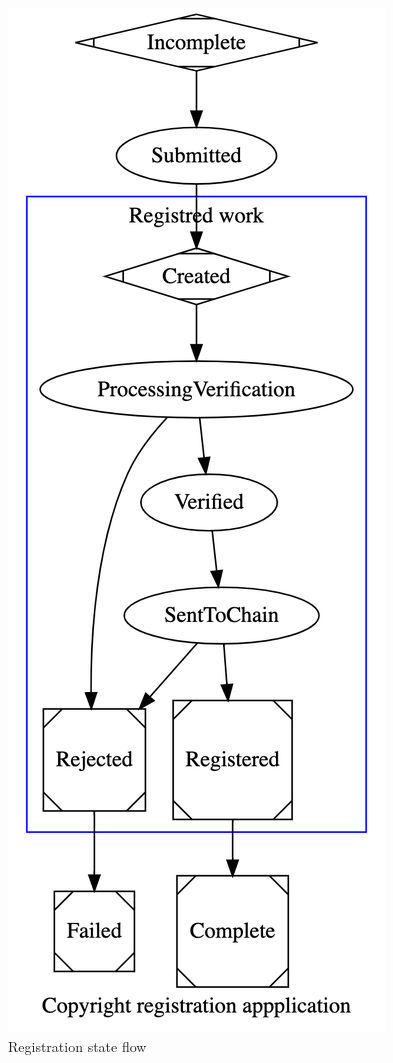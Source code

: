 \documentclass[12pt]{article}
\begin{document}
\begin{figure}[H]
\caption{Registration state flow}
\centering
\includegraphics[width=\textwidth,height=0.5\textheight,keepaspectratio]{images/operational/cpy-registration-status-graph}
\end{figure}
\end{document}
